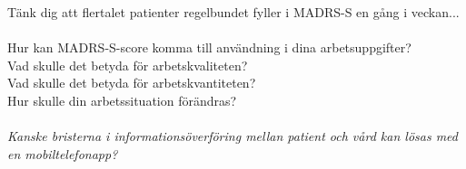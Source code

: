 \documentclass[english]{beamer}
\begin{document}
\begin{frame}
Tänk dig att flertalet patienter regelbundet fyller i MADRS-S en gång i veckan...\\\ \\
\pause
\textcolor{lila}{Hur kan MADRS-S-score komma till användning i dina arbetsuppgifter?}\\
\pause
\textcolor{lila}{Vad skulle det betyda för arbetskvaliteten?}\\
\pause
\textcolor{lila}{Vad skulle det betyda för arbetskvantiteten?}\\
\pause
\textcolor{lila}{Hur skulle din arbetssituation förändras?}\\\ \\
\pause
\textit{Kanske bristerna i informationsöverföring mellan patient och vård kan lösas med en mobiltelefonapp?}
\end{frame}


\subsection{}
\begin{frame}
	\frametitle{}
{}
\end{frame}

\begin{frame}
	\frametitle{}
{}
\end{frame}

\begin{frame}
	\frametitle{}
{}
\end{frame}

\begin{frame}
	\frametitle{}
{}
\end{frame}
\end{document}
